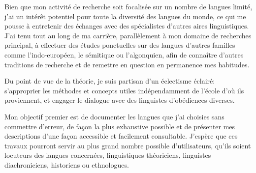 \documentclass[oldfontcommands,oneside,a4paper,11pt]{memoir}
\begin{document}
Bien que mon activité de recherche soit focalisée sur un nombre de langues limité, j'ai un intérêt potentiel pour toute la diversité des langues du monde, ce qui me pousse à entretenir des échanges avec des spécialistes d'autres aires linguistiques. J'ai tenu tout au long de ma carrière, parallèlement à mon domaine de recherches principal,  à effectuer des études ponctuelles sur des langues d'autres familles comme l'indo-européen, le sémitique ou l'algonquien, afin de connaître    d'autres traditions de recherche et de remettre en question en permanence mes habitudes.

 
Du point de vue de la théorie, je suis partisan d'un éclectisme éclairé: s'approprier  les méthodes et concepts utiles  indépendamment de l'école d'où ils proviennent, et engager le dialogue avec des linguistes d'obédiences diverses. 

Mon objectif  premier est de documenter les langues que j'ai choisies sans commettre d'erreur, de façon la plus exhaustive possible et de présenter mes descriptions d'une façon accessible et facilement consultable. J'espère que ces travaux pourront servir au plus grand nombre possible d'utilisateurs, qu'ils soient locuteurs des langues concernées, linguistiques théoriciens, linguistes diachroniciens, historiens ou ethnologues.



\pagebreak
	\tableofcontents
\end{document}
